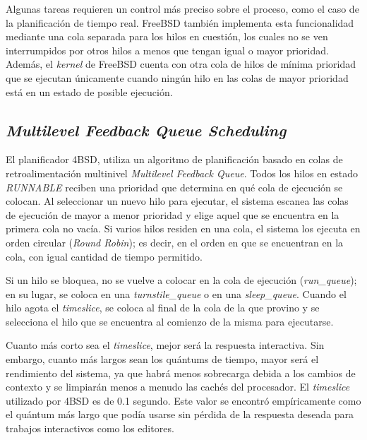Algunas tareas requieren un control más preciso sobre el proceso, como el caso de la planificación de tiempo real. FreeBSD también implementa esta funcionalidad mediante una cola separada para los hilos en cuestión, los cuales no se ven interrumpidos por otros hilos a menos que tengan igual o mayor prioridad. Además, el \textit{kernel} de FreeBSD cuenta con otra cola de hilos de mínima prioridad que se ejecutan únicamente cuando ningún hilo en las colas de mayor prioridad está en un estado de posible ejecución.\par

\subsection{\textit{Multilevel Feedback Queue Scheduling}}

El planificador 4BSD, utiliza un algoritmo de planificación basado en colas de retroalimentación multinivel \textit{Multilevel Feedback Queue}. Todos los hilos en estado \textit{RUNNABLE} reciben una prioridad que determina en qué cola de ejecución se colocan. Al seleccionar un nuevo hilo para ejecutar, el sistema escanea las colas de ejecución de mayor a menor prioridad y elige aquel que se encuentra en la primera cola no vacía. Si varios hilos residen en una cola, el sistema los ejecuta en orden circular (\textit{Round Robin}); es decir, en el orden en que se encuentran en la cola, con igual cantidad de tiempo permitido.\par

Si un hilo se bloquea, no se vuelve a colocar en la cola de ejecución (\textit{run\_queue}); en su lugar, se coloca en una \textit{turnstile\_queue} o en una \textit{sleep\_queue}. Cuando el hilo agota el \textit{timeslice}, se coloca al final de la cola de la que provino y se selecciona el hilo que se encuentra al comienzo de la misma para ejecutarse.\par

Cuanto más corto sea el \textit{timeslice}, mejor será la respuesta interactiva. Sin embargo, cuanto más largos sean los quántums de tiempo, mayor será el rendimiento del sistema, ya que habrá menos sobrecarga debida a los cambios de contexto y se limpiarán menos a menudo las cachés del procesador. El \textit{timeslice} utilizado por 4BSD es de 0.1 segundo. Este valor se encontró empíricamente como el quántum más largo que podía usarse sin pérdida de la respuesta deseada para trabajos interactivos como los editores.\par

